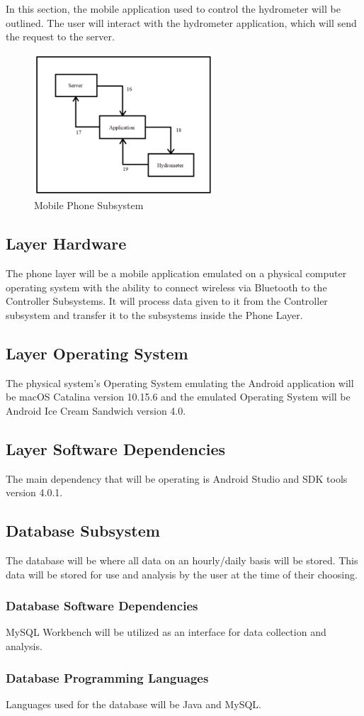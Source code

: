 In this section, the mobile application used to control the hydrometer will be outlined. The user will interact with the hydrometer application, which will send the request to the server.

\begin{figure}[h!]
	\centering
 	\includegraphics[width=0.60\textwidth]{images/mobile_phone_subsystem}
 \caption{Mobile Phone Subsystem}
\end{figure}

\subsection{Layer Hardware}
The phone layer will be a mobile application emulated on a physical computer operating system with the ability to connect wireless via Bluetooth to the Controller Subsystems. It will process data given to it from the Controller subsystem and transfer it to the subsystems inside the Phone Layer.

\subsection{Layer Operating System}
The physical system's Operating System emulating the Android application will be macOS Catalina version 10.15.6 and the emulated Operating System will be Android Ice Cream Sandwich version 4.0.

\subsection{Layer Software Dependencies}
The main dependency that will be operating is Android Studio and SDK tools version 4.0.1.

\subsection{Database Subsystem}
The database will be where all data on an hourly/daily basis will be stored. This data will be stored for use and analysis by the user at the time of their choosing.

\subsubsection{Database Software Dependencies}
MySQL Workbench will be utilized as an interface for data collection and analysis.

\subsubsection{Database Programming Languages}
Languages used for the database will be Java and MySQL.